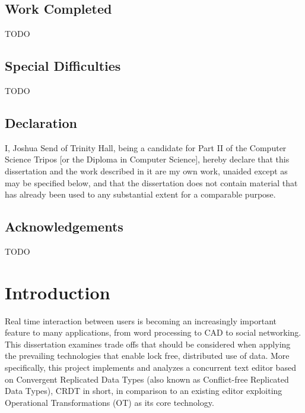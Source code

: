 \documentclass[12pt,a4paper,twoside,openright]{report}
\begin{document}
\section*{Work Completed}

TODO

\section*{Special Difficulties}

TODO
 
\newpage
\section*{Declaration}

I, Joshua Send of Trinity Hall, being a candidate for Part II of the Computer
Science Tripos [or the Diploma in Computer Science], hereby declare
that this dissertation and the work described in it are my own work,
unaided except as may be specified below, and that the dissertation
does not contain material that has already been used to any substantial
extent for a comparable purpose.

\bigskip
{}

\medskip
{}

\tableofcontents

\listoffigures

\newpage
\section*{Acknowledgements}

TODO


\pagestyle{headings}

\chapter{Introduction}

Real time interaction between users is becoming an increasingly important feature to many applications, from word processing to CAD to social networking. This dissertation examines trade offs that should be considered when applying the prevailing technologies that enable lock free, distributed use of data. More specifically, this project implements and analyzes a concurrent text editor based on Convergent Replicated Data Types (also known as Conflict-free Replicated Data Types), CRDT in short, in comparison to an existing editor exploiting Operational Transformations (OT) as its core technology.
\end{document}
